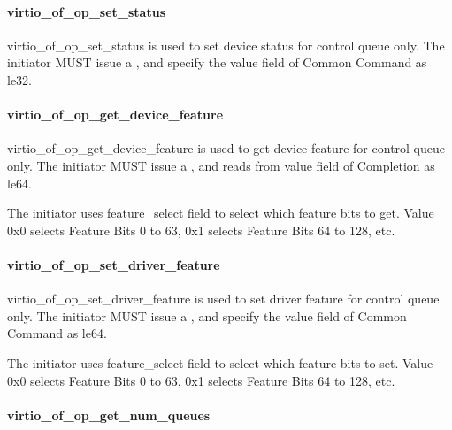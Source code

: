 \paragraph{virtio_of_op_set_status}\label{sec:Virtio Transport Options / Virtio Over Fabrics / Transmission Protocol / Opcodes Definition / virtio_of_op_set_status}

virtio_of_op_set_status is used to set device status for control queue only. The initiator MUST issue a , and specify the value field of Common Command as le32.

\paragraph{virtio_of_op_get_device_feature}\label{sec:Virtio Transport Options / Virtio Over Fabrics / Transmission Protocol / Opcodes Definition / virtio_of_op_get_device_feature}

virtio_of_op_get_device_feature is used to get device feature for control queue only. The initiator MUST issue a , and reads from value field of Completion as le64.

The initiator uses feature_select field to select which feature bits to get. Value 0x0 selects Feature Bits 0 to 63, 0x1 selects Feature Bits 64 to 128, etc.

\paragraph{virtio_of_op_set_driver_feature}\label{sec:Virtio Transport Options / Virtio Over Fabrics / Transmission Protocol / Opcodes Definition / virtio_of_op_set_driver_feature}

virtio_of_op_set_driver_feature is used to set driver feature for control queue only. The initiator MUST issue a , and specify the value field of Common Command as le64.

The initiator uses feature_select field to select which feature bits to set. Value 0x0 selects Feature Bits 0 to 63, 0x1 selects Feature Bits 64 to 128, etc.

\paragraph{virtio_of_op_get_num_queues}\label{sec:Virtio Transport Options / Virtio Over Fabrics / Transmission Protocol / Opcodes Definition / virtio_of_op_get_num_queues}

